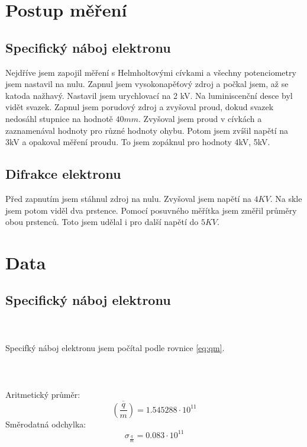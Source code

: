 \documentclass{article}
\begin{document}
\section{Postup měření}
\subsection{Specifický náboj elektronu}
Nejdříve jsem zapojil měření s Helmholtovými cívkami a všechny potenciometry jsem nastavil na nulu.
Zapnul jsem vysokonapěťový zdroj a počkal jsem, až se katoda nažhavý.
Nastavil jsem urychlovací na 2 kV. Na luminiscenční desce byl vidět svazek.
Zapnul jsem porudový zdroj a zvyšoval proud, dokud svazek nedosáhl stupnice na hodnotě $40 mm$.
Zvyšoval jsem proud v cívkách a zaznamenával hodnoty pro různé hodnoty ohybu.
Potom jsem zvíšil napětí na 3kV a opakoval měření proudu.
To jsem zopáknul pro hodnoty 4kV, 5kV.
\subsection{Difrakce elektronu}
Před zapnutím jsem stáhnul zdroj na nulu. Zvyšoval jsem napětí na $4KV$. Na skle jsem potom viděl
dva prstence. Pomocí posuvného měřítka jsem změřil průměry obou prstenců. Toto jsem udělal i pro další napětí do $5KV$.
\section{Data}
\subsection{Specifický náboj elektronu}
\\
\vspace{1em}
\\
Specifký náboj elektronu jsem počítal podle rovnice \ref{eq:qm}.
\\
\vspace{1em}
\\
\\
\vspace{1em}
\\
Aritmetický průměr:
$$\overline{ \left( \frac{q}{m} \right)} = 1.545288 \cdot 10^{11}$$
Směrodatná odchylka:
$$\sigma_{\frac{q}{m}} = 0.083 \cdot 10^{11}$$
\end{document}
